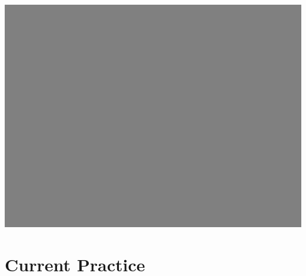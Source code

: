 \documentclass[compress,english]{beamer}
\begin{document}
{\usebackgroundtemplate%
	{\includegraphics[height=\paperheight]{background_grey.png}}
\section{Current Practice}
}
\end{document}
